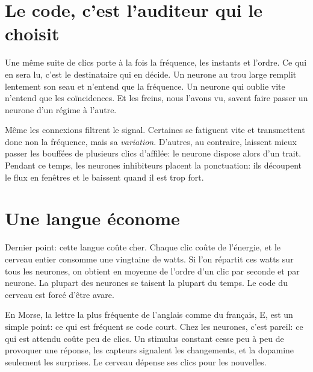 
\section*{Le code, c'est l'auditeur qui le choisit}

Une même suite de clics porte à la fois la fréquence, les instants et l'ordre. Ce qui en sera lu, c'est le destinataire qui en décide. Un neurone au \og trou large\fg{} remplit lentement son seau et n'entend que la fréquence. Un neurone qui oublie vite n'entend que les coïncidences. Et les freins, nous l'avons vu, savent faire passer un neurone d'un régime à l'autre.

Même les connexions filtrent le signal. Certaines se fatiguent vite et transmettent donc non la fréquence, mais sa \emph{variation}. D'autres, au contraire, laissent mieux passer les bouffées de plusieurs clics d'affilée: le neurone dispose alors d'un \og trait\fg{}. Pendant ce temps, les neurones inhibiteurs placent la ponctuation: ils découpent le flux en fenêtres et le baissent quand il est trop fort.

\section*{Une langue économe}

Dernier point: cette langue coûte cher. Chaque clic coûte de l'énergie, et le cerveau entier consomme une vingtaine de watts. Si l'on répartit ces watts sur tous les neurones, on obtient en moyenne de l'ordre d'un clic par seconde et par neurone. La plupart des neurones se taisent la plupart du temps. Le code du cerveau est forcé d'être avare.

En Morse, la lettre la plus fréquente de l'anglais comme du français, E, est un simple point: ce qui est fréquent se code court. Chez les neurones, c'est pareil: ce qui est attendu coûte peu de clics. Un stimulus constant cesse peu à peu de provoquer une réponse, les capteurs signalent les changements, et la dopamine seulement les surprises. Le cerveau dépense ses clics pour les nouvelles.

